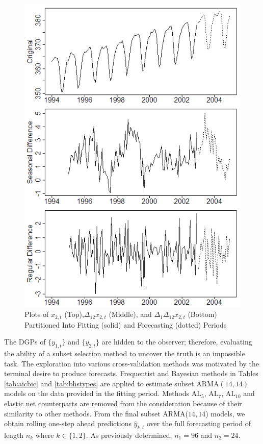 \begin{figure}[htbp]
	\centering
	\caption{Plots of $x_{2,t}$ (Top),$\Delta_{12}x_{2,t}$ (Middle), and $\Delta_1\Delta_{12}x_{2,t}$ (Bottom) Partitioned Into Fitting (solid) and Forecasting (dotted) Periods}
	\label{fig:co2plots2}
	\includegraphics[scale=0.55]{co2plots2}
\end{figure}

The DGPs of $\{y_{1,t}\}$ and $\{y_{2,t}\}$ are hidden to the observer; therefore, evaluating the ability of a subset selection method to uncover the truth is an impossible task. The exploration into various cross-validation methods was motivated by the terminal desire to produce forecasts. Frequentist and Bayesian methods in Tables \ref{tab:aicbic} and \ref{tab:bhstypes} are applied to estimate subset ARMA$(14,14)$ models on the data provided in the fitting period. Methods $\textrm{AL}_5$, $\textrm{AL}_7$, $\textrm{AL}_{10}$ and elastic net counterparts are removed from the consideration because of their similarity to other methods. From the final subset ARMA($14,14$) models, we obtain rolling one-step ahead predictions $\hat{y}_{k,t}$ over the full forecasting period of length $n_k$ where $k\in\{1,2\}$.  As previously determined, $n_1=96$ and $n_2=24$.  

